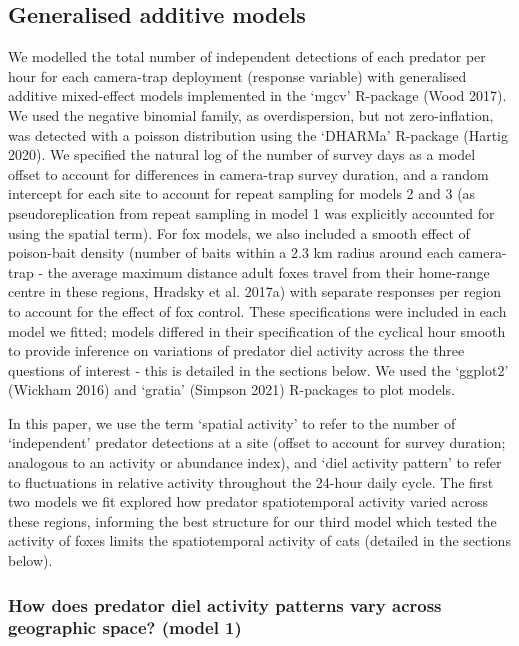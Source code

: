 \documentclass[preprint, 3p, authoryear]{elsarticle} %
\begin{document}
\hypertarget{generalised-additive-models}{%
\subsection{Generalised additive models}\label{generalised-additive-models}}

We modelled the total number of independent detections of each predator per hour for each camera-trap deployment (response variable) with generalised additive mixed-effect models implemented in the `mgcv' R-package (Wood 2017). We used the negative binomial family, as overdispersion, but not zero-inflation, was detected with a poisson distribution using the `DHARMa' R-package (Hartig 2020). We specified the natural log of the number of survey days as a model offset to account for differences in camera-trap survey duration, and a random intercept for each site to account for repeat sampling for models 2 and 3 (as pseudoreplication from repeat sampling in model 1 was explicitly accounted for using the spatial term). For fox models, we also included a smooth effect of poison-bait density (number of baits within a 2.3 km radius around each camera-trap - the average maximum distance adult foxes travel from their home-range centre in these regions, Hradsky et al. 2017a) with separate responses per region to account for the effect of fox control. These specifications were included in each model we fitted; models differed in their specification of the cyclical hour smooth to provide inference on variations of predator diel activity across the three questions of interest - this is detailed in the sections below. We used the `ggplot2' (Wickham 2016) and `gratia' (Simpson 2021) R-packages to plot models.

In this paper, we use the term `spatial activity' to refer to the number of `independent' predator detections at a site (offset to account for survey duration; analogous to an activity or abundance index), and `diel activity pattern' to refer to fluctuations in relative activity throughout the 24-hour daily cycle. The first two models we fit explored how predator spatiotemporal activity varied across these regions, informing the best structure for our third model which tested the activity of foxes limits the spatiotemporal activity of cats (detailed in the sections below).

\hypertarget{how-does-predator-diel-activity-patterns-vary-across-geographic-space-model-1}{%
\subsubsection{How does predator diel activity patterns vary across geographic space? (model 1)}\label{how-does-predator-diel-activity-patterns-vary-across-geographic-space-model-1}}
\end{document}

